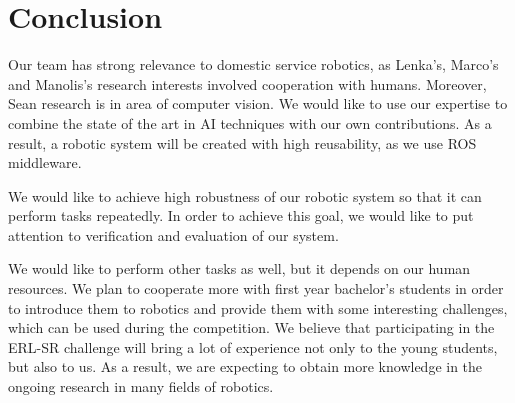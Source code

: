 \documentclass[conference]{IEEEtran}
\begin{document}
%



\section{Conclusion}
Our team has strong relevance to domestic service robotics, as
Lenka's, Marco's and Manolis's research interests involved cooperation with
humans. Moreover, Sean research is in area of computer vision. 
We would like to use our expertise to combine the state of the art
in AI techniques with our own contributions. As a result, a robotic system
will be created with high reusability, as we use ROS middleware.

We would like to achieve high robustness of our robotic system so that it can perform tasks repeatedly. In order to achieve this goal, we would like to put attention to verification and evaluation of our system. 

We would like to perform other tasks as well, but it depends on our human resources.
We plan to cooperate more with first year bachelor's students in
order to introduce them to robotics and provide them with some interesting
challenges, which can be used during the competition. We believe that
participating in the ERL-SR challenge will bring a lot of experience
not only to the young students, but also to us. As a result, we are
expecting to obtain more knowledge in the ongoing research in many fields
of robotics.
\end{document}
